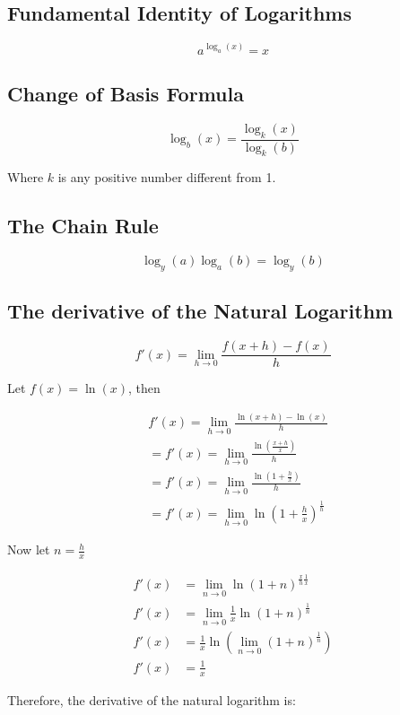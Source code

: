 \subsection{Fundamental Identity of Logarithms}

\[
    a^{\log_a(x)} = x
\]

\subsection{Change of Basis Formula}

\[
    \log_b(x) = \frac{\log_k(x)}{\log_k(b)}
\]

Where \(k\) is any positive number different from 1.

\subsection{The Chain Rule}
\[
    \log_y(a) \log_a(b) = \log_y(b)
\]

\subsection{The derivative of the Natural Logarithm}

\[
    f'(x) = \lim_{h \to 0} \frac{f(x + h) - f(x)}{h}
\]

Let \(f(x) = \ln(x)\), then

\begin{align*}
    &f'(x) = \lim_{h \to 0} \frac{\ln(x + h) - \ln(x)}{h}\\
    &= f'(x) = \lim_{h \to 0} \frac{\ln\left(\frac{x + h}{x}\right)}{h}\\
    &= f'(x) = \lim_{h \to 0} \frac{\ln\left(1 + \frac{h}{x}\right)}{h}\\
    &= f'(x) = \lim_{h \to 0} \ln{\left(1 + \frac{h}{x}\right)}^{\frac{1}{h}}
\end{align*}
 
Now let \(n = \frac{h}{x}\)

\begin{align*}
    f'(x) &= \lim_{n \to 0} \ln{\left(1 + n\right)}^{\frac{x}{h} \frac{1}{x}}\\
    f'(x) &= \lim_{n \to 0} \frac{1}{x} \ln{\left(1 + n\right)}^{\frac{1}{n}}\\
    f'(x) &= \frac{1}{x} \ln \left(\lim_{n \to 0} {(1 + n)}^{\frac{1}{n}}\right)\\
    f'(x) &= \frac{1}{x}
\end{align*}

Therefore, the derivative of the natural logarithm is:

